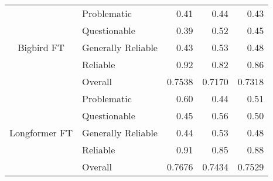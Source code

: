 \begin{table}[htbp]
\begin{tabular}{| c | l | r | r | r |}
        \multirow{5}{*}{Bigbird FT}                       & Problematic        & 0.41               & 0.44            & 0.43            \\
                                                          & Questionable       & 0.39               & 0.52            & 0.45            \\
                                                          & Generally Reliable & 0.43               & 0.53            & 0.48            \\
                                                          & Reliable           & 0.92               & 0.82            & 0.86            \\\cline{2-5}
                                                          & Overall            & 0.7538             & 0.7170          & 0.7318          \\
        \hline
        \multirow{5}{*}{Longformer FT}                    & Problematic        & 0.60               & 0.44            & 0.51            \\
                                                          & Questionable       & 0.45               & 0.56            & 0.50            \\
                                                          & Generally Reliable & 0.44               & 0.53            & 0.48            \\
                                                          & Reliable           & 0.91               & 0.85            & 0.88            \\\cline{2-5}
                                                          & Overall            & 0.7676             & 0.7434          & 0.7529          \\
        \hline

\end{tabular}
\end{table}
